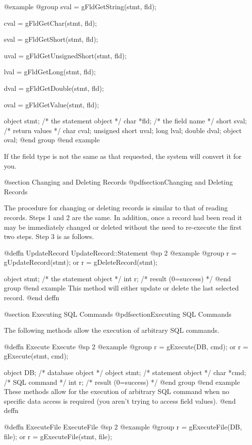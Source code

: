 @example
@group
sval = gFldGetString(stmt, fld);

cval = gFldGetChar(stmt, fld);

sval = gFldGetShort(stmt, fld);

uval = gFldGetUnsignedShort(stmt, fld);

lval = gFldGetLong(stmt, fld);

dval = gFldGetDouble(stmt, fld);

oval = gFldGetValue(stmt, fld);

object  stmt;   /*  the statement object  */
char    *fld;   /*  the field name        */
short   sval;   /*  return values         */
char    cval;
unsigned short uval;
long    lval;
double  dval;
object  oval;
@end group
@end example

If the field type is not the same as that requested, the system will
convert it for you.


@section Changing and Deleting Records
@pdfsection{Changing and Deleting Records}

The procedure for changing or deleting records is similar to that of
reading records.  Steps 1 and 2 are the same.  In addition, once a
record had been read it may be immediately changed or deleted without the
need to re-execute the first two steps.  Step 3 is as follows.

@deffn {UpdateRecord}  UpdateRecord::Statement
@sp 2
@example
@group
r = gUpdateRecord(stmt);
        or
r = gDeleteRecord(stmt);

object  stmt;   /*  the statement object  */
int     r;      /*  result (0=success)    */
@end group
@end example
This method will either update or delete the last selected record.
@end deffn


@section Executing SQL Commands
@pdfsection{Executing SQL Commands}

The following methods allow the execution of arbitrary SQL commands.

@deffn {Execute}  Execute
@sp 2
@example
@group
r = gExecute(DB, cmd);
     or
r = gExecute(stmt, cmd);

object  DB;     /*  database object    */
object  stmt;   /*  statement object   */
char    *cmd;   /*  SQL command        */
int     r;      /*  result (0=success) */
@end group
@end example
These methods allow for the execution of arbitrary SQL command when no
specific data access is required (you aren't trying to access field
values).
@end deffn


@deffn {ExecuteFile}  ExecuteFile
@sp 2
@example
@group
r = gExecuteFile(DB, file);
       or
r = gExecuteFile(stmt, file);

